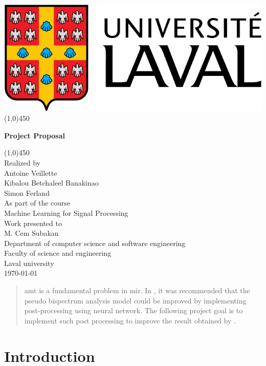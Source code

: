 \documentclass[12pt]{article}
\begin{document}
\begin{titlepage}
\begin{center}
\includegraphics[scale=0.35]{figs/ul_logo.pdf} 
\line(1,0){450}\\
[2mm]
\begin{large}
\textbf{Project Proposal} \\ 
\end{large}
\line(1,0){450}\\
[1.5cm]
Realized by\\
Antoine Veillette\\
Kibalou Betchaleel Banakinao\\
Simon Ferland\\
[3cm]
As part of the course\\
Machine Learning for Signal Processing\\ 
[2.5cm]
Work presented to\\
M. Cem Subakan\\
[3cm]
Department of computer science and software engineering\\
Faculty of science and engineering\\
Laval university\\

\today
\end{center}
\end{titlepage}
\begin{abstract}
\acrfull{amt}  is a fundamental problem in 
\acrfull{mir}. In \cite{Zhang2020}, it was recommended that the pseudo bispectrum analysis model could be improved by implementing post-processing using neural network. The following project goal is to implement such post processing to improve the result obtained by \cite{Zhang2020}.

\end{abstract}
\section{Introduction}
\end{document}
